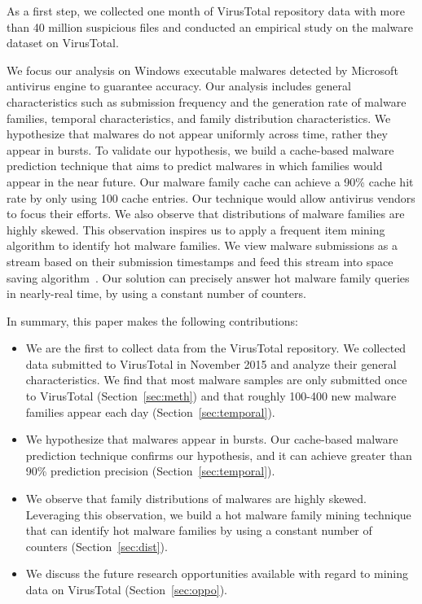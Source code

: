 As a first step, we collected one month of VirusTotal repository data with more than 40 million suspicious files
and conducted an empirical study on the malware dataset on VirusTotal. 

We focus our analysis on Windows executable malwares detected by Microsoft
antivirus engine to guarantee accuracy. 
Our analysis includes general characteristics such as submission frequency and the generation rate of malware families, 
temporal characteristics, and family distribution characteristics. 
We hypothesize that malwares do not appear uniformly across time, rather they appear in bursts. 
To validate our hypothesis, we build a cache-based malware prediction technique that aims to predict malwares in which families would appear in the near future. 
Our malware family cache can achieve a 90\% cache hit rate by only using 100 cache entries.
Our technique would allow antivirus vendors to focus their efforts. 
We also observe that distributions of malware families are highly skewed. 
This observation inspires us to apply a frequent item mining algorithm to 
identify hot malware families. 
We view malware submissions as a stream based on their submission timestamps and 
feed this stream into space saving algorithm~\cite{space-saving}. 
Our solution can precisely answer hot malware family queries in nearly-real time, by using a constant number of counters.  



In summary, this paper makes the following contributions:

\begin{itemize}

\item We are the first to collect data from the VirusTotal repository.
We collected data submitted to VirusTotal in November 2015 
and analyze their general characteristics. 
We find that most malware samples are only submitted once to VirusTotal (Section~\ref{sec:meth}) 
and that roughly 100-400 new malware families appear each day (Section~\ref{sec:temporal}). 


\item We hypothesize that malwares appear in bursts. 
Our cache-based malware prediction technique confirms our hypothesis, 
and it can achieve greater than 90\% prediction precision (Section~\ref{sec:temporal}). 

\item We observe that family distributions of malwares are highly skewed. 
Leveraging this observation, we build a hot malware family mining technique that can identify hot 
malware families by using a constant number of counters (Section~\ref{sec:dist}).

\item We discuss the future research opportunities available with regard to mining data on VirusTotal (Section~\ref{sec:oppo}). 

\end{itemize}


